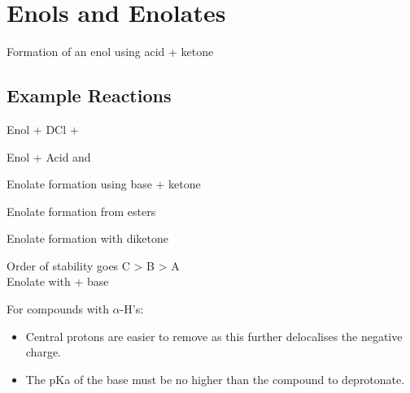 \section{Enols and Enolates}


Formation of an enol using acid + ketone


\subsection{Example Reactions}

Enol + DCl + 


Enol +  Acid and 


Enolate formation using base + ketone


Enolate formation from esters


Enolate formation with diketone


Order of stability goes C > B > A\\

Enolate with  + base


For compounds with $\alpha$-H's:
\begin{itemize}
  \item Central protons are easier to remove as this further delocalises the
    negative charge.
  \item The pKa of the base must be no higher than the compound to deprotonate.
\end{itemize}